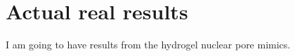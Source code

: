 \chapter{Actual real results}\label{ch04}
I am going to have results from the hydrogel nuclear pore mimics.